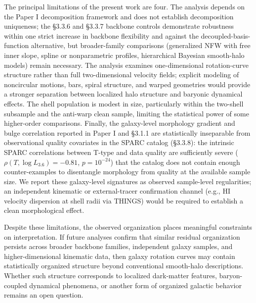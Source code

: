 \documentclass[linenumbers,trackchanges]{aastex701}
\begin{document}
The principal limitations of the present work are four. The analysis depends on the Paper I decomposition framework and does not establish decomposition uniqueness; the \S3.3.6 and \S3.3.7 backbone controls demonstrate robustness within one strict increase in backbone flexibility and against the decoupled-basis-function alternative, but broader-family comparisons (generalized NFW with free inner slope, spline or nonparametric profiles, hierarchical Bayesian smooth-halo models) remain necessary. The analysis examines one-dimensional rotation-curve structure rather than full two-dimensional velocity fields; explicit modeling of noncircular motions, bars, spiral structure, and warped geometries would provide a stronger separation between localized halo structure and baryonic dynamical effects. The shell population is modest in size, particularly within the two-shell subsample and the anti-warp clean sample, limiting the statistical power of some higher-order comparisons. Finally, the galaxy-level morphology gradient and bulge correlation reported in Paper I and \S3.1.1 are statistically inseparable from observational quality covariates in the SPARC catalog (\S3.3.8): the intrinsic SPARC correlations between T-type and data quality are sufficiently severe ($\rho(T, \log L_{3.6}) = -0.81$, $p = 10^{-24}$) that the catalog does not contain enough counter-examples to disentangle morphology from quality at the available sample size. We report these galaxy-level signatures as observed sample-level regularities; an independent kinematic or external-tracer confirmation channel (e.g., HI velocity dispersion at shell radii via THINGS) would be required to establish a clean morphological effect.

Despite these limitations, the observed organization places meaningful constraints on interpretation. If future analyses confirm that similar residual organization persists across broader backbone families, independent galaxy samples, and higher-dimensional kinematic data, then galaxy rotation curves may contain statistically organized structure beyond conventional smooth-halo descriptions. Whether such structure corresponds to localized dark-matter features, baryon-coupled dynamical phenomena, or another form of organized galactic behavior remains an open question.
\end{document}
